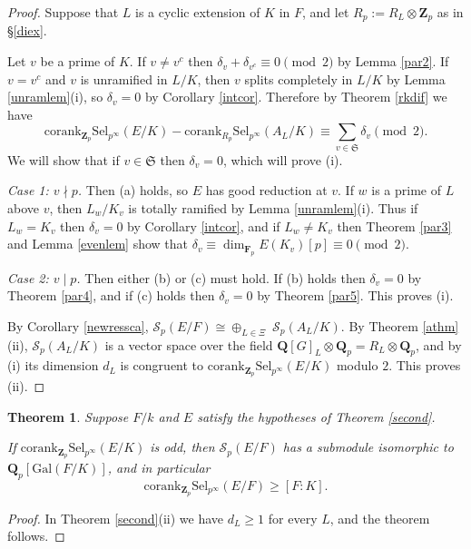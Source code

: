 \documentclass[reqno]{amsart}
\newtheorem{thm}{Theorem}[section]
\theoremstyle{definition}
\def\Z{\mathbf{Z}}
\def\Q{\mathbf{Q}}
\def\F{\mathbf{F}}
\def\Zp{\Z_p}
\def\Qp{\Q_p}
\def\Fp{\F_p}
\def\cS{\mathcal{S}}
\def\Gal{\mathrm{Gal}}
\def\cork{\mathrm{corank}}
\def\Sel{\mathrm{Sel}}
\def\Scp{\cS_p}
\def\rf{\Fp}
\def\Sbad{\mathfrak{S}}
\begin{document}
\begin{proof}
Suppose that $L$ is a cyclic extension of $K$ in $F$, and 
let $R_p := R_L \otimes \Zp$ as in \S\ref{diex}.

Let $v$ be a prime of $K$.
If $v \ne v^c$ then $\delta_v + \delta_{v^c} \equiv 0 \pmod{2}$ by Lemma \ref{par2}.  
If $v = v^c$ and $v$ is unramified in $L/K$, then $v$ splits completely 
in $L/K$ by Lemma \ref{unramlem}(i), so $\delta_v = 0$ by 
Corollary \ref{intcor}.
Therefore by Theorem \ref{rkdif} we have 
$$
\cork_{\Zp}\Sel_{p^\infty}(E/K) - \cork_{R_p}\Sel_{p^\infty}(A_L/K) 
    \equiv \sum_{v \in \Sbad} \delta_v \pmod{2}.
$$
We will show that if $v \in \Sbad$ then $\delta_v = 0$, which will prove (i).

{\em Case 1: $v \nmid p$.}  
Then (a) holds, so $E$ has good reduction at $v$.  
If $w$ is a prime of $L$ above $v$, then $L_w/K_v$ is totally ramified 
by Lemma \ref{unramlem}(i).  Thus 
if $L_w = K_v$ then $\delta_v = 0$ by Corollary \ref{intcor}, and   
if $L_w \ne K_v$ then Theorem \ref{par3} and Lemma \ref{evenlem} show that 
$
\delta_v \equiv \dim_{\rf}E(K_v)[p] \equiv 0 \pmod{2}.
$

{\em Case 2: $v \mid p$.}  
Then either (b) or (c) must hold.
If (b) holds then $\delta_v = 0$ by Theorem \ref{par4}, and if (c) 
holds then $\delta_v = 0$ by Theorem \ref{par5}.  This proves (i).

By Corollary \ref{newressca}, 
$\Scp(E/F) \cong \oplus_{L \in \Xi} \;\Scp(A_L/K)$.  
By Theorem \ref{athm}(ii), 
$\Scp(A_L/K)$ is a vector space over the field 
$\Q[G]_L \otimes \Qp = R_L \otimes \Qp$,
and by (i) its dimension $d_L$ is congruent to 
$\cork_{\Zp}\Sel_{p^\infty}(E/K)$ modulo $2$.    
This proves (ii).
\end{proof}

\begin{thm}
\label{third}
Suppose $F/k$ and $E$ satisfy the hypotheses of Theorem \ref{second}.  

If $\cork_{\Zp}\Sel_{p^\infty}(E/K)$ is odd, then 
$\Scp(E/F)$ has a submodule isomorphic to 
$\Qp[\Gal(F/K)]$, and in particular 
$$
\cork_{\Zp}\Sel_{p^\infty}(E/F) \ge [F:K].
$$
\end{thm}

\begin{proof}
In Theorem \ref{second}(ii) we have $d_L \ge 1$ for every $L$, 
and the theorem follows.
\end{proof}
\end{document}
